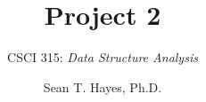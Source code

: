 \documentclass[14pt,aspectratio=1610]{beamer}
\title{\Huge{} Project 2}
\subtitle{CSCI 315: \textit{Data Structure Analysis}}
\author{Sean T. Hayes, Ph.D.}
\institute{Charleston Southern University}
\begin{document}
\begin{frame}
  \titlepage{}
\end{frame}
\end{document}
